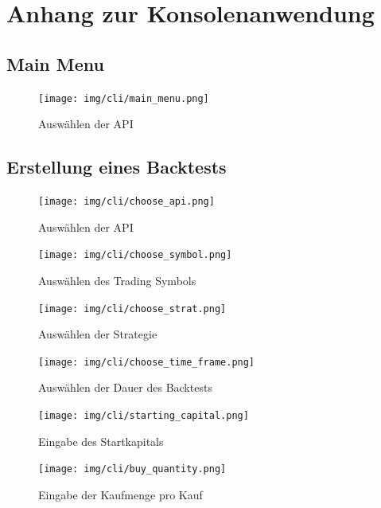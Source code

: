 \documentclass[oneside]{ausarbeitung}
\begin{document}
\printbibliography[heading=bibintoc]

\chapter{Anhang zur Konsolenanwendung}
\label{anhang_zur_konsolenanwendung}

\section{Main Menu}
\label{sec:main_menu}

\begin{figure}[H]
  \centering
  \texttt{[image: img/cli/main\_menu.png]}
  \caption{Auswählen der API}
  \label{fig:}
\end{figure}

\section{Erstellung eines Backtests}
\label{sec:erstellung_eines_backtests}

\begin{figure}[H]
  \centering
  \texttt{[image: img/cli/choose\_api.png]}
  \caption{Auswählen der API}
  \label{fig:}
\end{figure}

\begin{figure}[H]
  \centering
  \texttt{[image: img/cli/choose\_symbol.png]}
  \caption{Auswählen des Trading Symbols}
  \label{fig:}
\end{figure}

\begin{figure}[H]
  \centering
  \texttt{[image: img/cli/choose\_strat.png]}
  \caption{Auswählen der Strategie}
  \label{fig:}
\end{figure}

\begin{figure}[H]
  \centering
  \texttt{[image: img/cli/choose\_time\_frame.png]}
  \caption{Auswählen der Dauer des Backtests}
  \label{fig:}
\end{figure}

\begin{figure}[H]
  \centering
  \texttt{[image: img/cli/starting\_capital.png]}
  \caption{Eingabe des Startkapitals}
  \label{fig:}
\end{figure}

\begin{figure}[H]
  \centering
  \texttt{[image: img/cli/buy\_quantity.png]}
  \caption{Eingabe der Kaufmenge pro Kauf}
  \label{fig:}
\end{figure}
\end{document}
